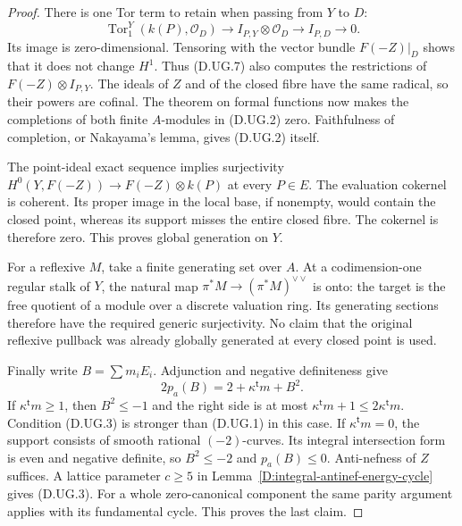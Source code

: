 \begin{proof}
There is one Tor term to retain when passing from $Y$ to $D$:
\[
 \operatorname{Tor}_1^Y(k(P),\mathcal O_D)
       \longrightarrow I_{P,Y}\otimes\mathcal O_D
       \longrightarrow I_{P,D}\longrightarrow0.
                                                               \tag{D.UG.8}
\]
Its image is zero-dimensional. Tensoring with the vector
bundle $F(-Z)|_D$ shows that it does not change $H^1$.
Thus (D.UG.7) also computes the restrictions of
$F(-Z)\otimes I_{P,Y}$.
The ideals of $Z$ and of the closed fibre have the same
radical, so their powers are cofinal. The theorem on formal
functions now makes the completions of both finite $A$-modules
in (D.UG.2) zero. Faithfulness of completion, or Nakayama's
lemma, gives (D.UG.2) itself.

The point-ideal exact sequence implies surjectivity
$H^0(Y,F(-Z))\to F(-Z)\otimes k(P)$ at every $P\in E$.
The evaluation cokernel is coherent. Its proper image in the
local base, if nonempty, would contain the closed point, whereas
its support misses the entire closed fibre. The cokernel is
therefore zero. This proves global generation on $Y$.

For a reflexive $M$, take a finite generating set over $A$.
At a codimension-one regular stalk of $Y$, the natural map
$\pi^*M\to(\pi^*M)^{\vee\vee}$ is onto: the target is the
free quotient of a module over a discrete valuation ring.
Its generating sections therefore have the required generic
surjectivity. No claim that the original reflexive pullback
was already globally generated at every closed point is used.

Finally write $B=\sum m_iE_i$. Adjunction and negative
definiteness give
\[
          2p_a(B)=2+\kappa^{\mathsf t}m+B^2.
\]
If $\kappa^{\mathsf t}m\ge1$, then $B^2\le-1$ and the right
side is at most $\kappa^{\mathsf t}m+1\le2\kappa^{\mathsf t}m$.
Condition (D.UG.3) is stronger than (D.UG.1) in this case.
If $\kappa^{\mathsf t}m=0$, the support consists of smooth
rational $(-2)$-curves. Its integral intersection form is even
and negative definite, so $B^2\le-2$ and $p_a(B)\le0$.
Anti-nefness of $Z$ suffices. A lattice parameter $c\ge5$ in
Lemma~\ref{D:integral-antinef-energy-cycle} gives (D.UG.3).
For a whole zero-canonical component the same parity argument
applies with its fundamental cycle. This proves the last claim.
\end{proof}


